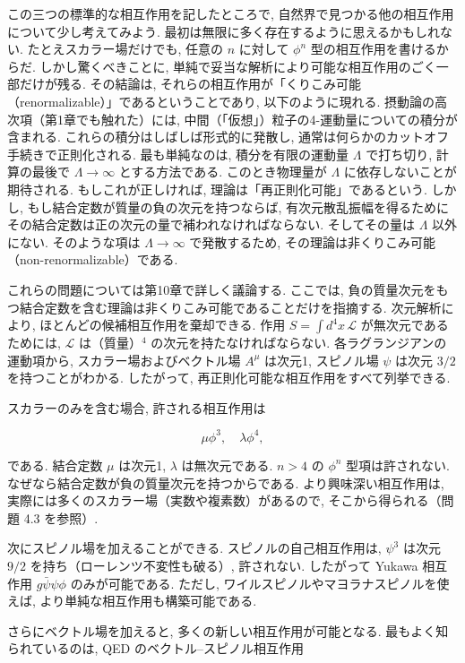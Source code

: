 \documentclass[a4paper,12pt]{article}
\begin{document}
この三つの標準的な相互作用を記したところで, 
自然界で見つかる他の相互作用について少し考えてみよう. 
最初は無限に多く存在するように思えるかもしれない. 
たとえスカラー場だけでも, 任意の $n$ に対して $\phi^n$ 型の相互作用を書けるからだ. 
しかし驚くべきことに, 単純で妥当な解析により可能な相互作用のごく一部だけが残る. 
その結論は, それらの相互作用が「くりこみ可能（renormalizable）」であるということであり, 
以下のように現れる. 
摂動論の高次項（第1章でも触れた）には, 
中間（「仮想」）粒子の4-運動量についての積分が含まれる. 
これらの積分はしばしば形式的に発散し, 通常は何らかのカットオフ手続きで正則化される. 
最も単純なのは, 積分を有限の運動量 $\Lambda$ で打ち切り, 
計算の最後で $\Lambda \to \infty$ とする方法である. 
このとき物理量が $\Lambda$ に依存しないことが期待される. 
もしこれが正しければ, 理論は「再正則化可能」であるという. 
しかし, もし結合定数が質量の負の次元を持つならば, 
有次元散乱振幅を得るためにその結合定数は正の次元の量で補われなければならない. 
そしてその量は $\Lambda$ 以外にない. 
そのような項は $\Lambda \to \infty$ で発散するため, 
その理論は非くりこみ可能（non-renormalizable）である.

これらの問題については第10章で詳しく議論する. 
ここでは, 負の質量次元をもつ結合定数を含む理論は非くりこみ可能であることだけを指摘する. 
次元解析により, ほとんどの候補相互作用を棄却できる. 
作用 $S = \int d^4x \, \mathcal{L}$ が無次元であるためには, 
$\mathcal{L}$ は（質量）$^4$ の次元を持たなければならない. 
各ラグランジアンの運動項から, スカラー場およびベクトル場 $A^\mu$ は次元1, 
スピノル場 $\psi$ は次元 $3/2$ を持つことがわかる. 
したがって, 再正則化可能な相互作用をすべて列挙できる.

スカラーのみを含む場合, 許される相互作用は

\begin{equation*}
\mu \phi^3, \quad \lambda \phi^4 ,
\end{equation*}

である. 結合定数 $\mu$ は次元1, $\lambda$ は無次元である. 
$n>4$ の $\phi^n$ 型項は許されない. 
なぜなら結合定数が負の質量次元を持つからである. 
より興味深い相互作用は, 実際には多くのスカラー場（実数や複素数）があるので, 
そこから得られる（問題 4.3 を参照）.

次にスピノル場を加えることができる. 
スピノルの自己相互作用は, $\psi^3$ は次元 $9/2$ を持ち（ローレンツ不変性も破る）, 許されない. 
したがって Yukawa 相互作用 $g \bar{\psi}\psi \phi$ のみが可能である. 
ただし, ワイルスピノルやマヨラナスピノルを使えば, より単純な相互作用も構築可能である.

さらにベクトル場を加えると, 多くの新しい相互作用が可能となる. 
最もよく知られているのは, QED のベクトル--スピノル相互作用
\end{document}
